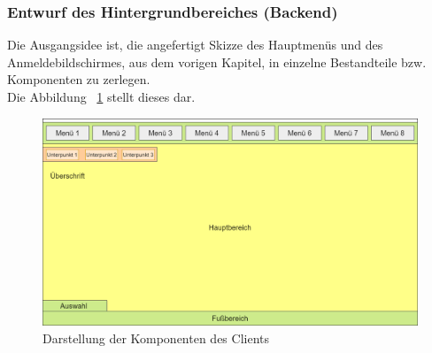 \subsubsection{Entwurf des Hintergrundbereiches (Backend)}\label{entwurf_des_Hintergrundbereiches_(Backend)}

Die Ausgangsidee ist, die angefertigt Skizze des Hauptmenüs und des Anmeldebildschirmes, aus dem vorigen Kapitel, in einzelne Bestandteile bzw. Komponenten zu zerlegen.\\
 Die Abbildung ~\ref{fig:kompo} stellt dieses dar. 

\begin{figure}[htb]
	\centering
	\includegraphics[width=1\textwidth,angle=0]{abb/kompo}
	\caption[Darstellung der Komponenten des Clients]{Darstellung der Komponenten des Clients}
	\label{fig:kompo}
\end{figure}

